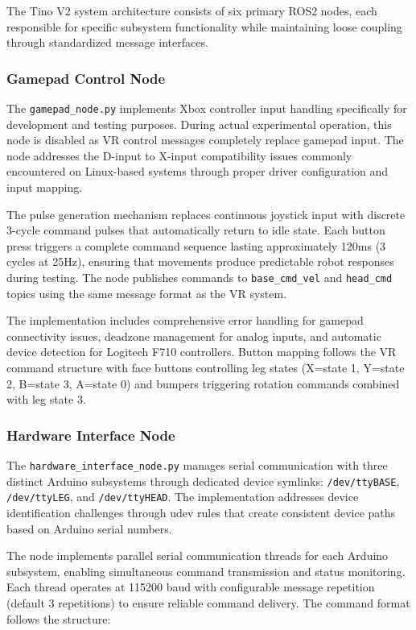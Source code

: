 The Tino V2 system architecture consists of six primary ROS2 nodes, each responsible for specific subsystem functionality while maintaining loose coupling through standardized message interfaces.

\subsubsection{Gamepad Control Node}

The \texttt{gamepad\_node.py} implements Xbox controller input handling specifically for development and testing purposes. During actual experimental operation, this node is disabled as VR control messages completely replace gamepad input. The node addresses the D-input to X-input compatibility issues commonly encountered on Linux-based systems through proper driver configuration and input mapping.

The pulse generation mechanism replaces continuous joystick input with discrete 3-cycle command pulses that automatically return to idle state. Each button press triggers a complete command sequence lasting approximately 120ms (3 cycles at 25Hz), ensuring that movements produce predictable robot responses during testing. The node publishes commands to \texttt{base\_cmd\_vel} and \texttt{head\_cmd} topics using the same message format as the VR system.

The implementation includes comprehensive error handling for gamepad connectivity issues, deadzone management for analog inputs, and automatic device detection for Logitech F710 controllers. Button mapping follows the VR command structure with face buttons controlling leg states (X=state 1, Y=state 2, B=state 3, A=state 0) and bumpers triggering rotation commands combined with leg state 3.

\subsubsection{Hardware Interface Node}

The \texttt{hardware\_interface\_node.py} manages serial communication with three distinct Arduino subsystems through dedicated device symlinks: \texttt{/dev/ttyBASE}, \texttt{/dev/ttyLEG}, and \texttt{/dev/ttyHEAD}. The implementation addresses device identification challenges through udev rules that create consistent device paths based on Arduino serial numbers.

The node implements parallel serial communication threads for each Arduino subsystem, enabling simultaneous command transmission and status monitoring. Each thread operates at 115200 baud with configurable message repetition (default 3 repetitions) to ensure reliable command delivery. The command format follows the structure: 

